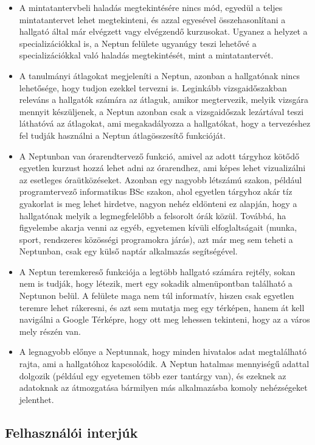 \documentclass[a4paper,12pt]{report}
\begin{document}
\begin{itemize}
    \item A mintatantervbeli haladás megtekintésére nincs mód, egyedül a teljes mintatantervet lehet megtekinteni, és azzal egyesével összehasonlítani a hallgató által már elvégzett vagy elvégzendő kurzusokat. Ugyanez a helyzet a specializációkkal is, a Neptun felülete ugyanúgy teszi lehetővé a specializációkkal való haladás megtekintését, mint a mintatantervét.
    \item A tanulmányi átlagokat megjeleníti a Neptun, azonban a hallgatónak nincs lehetősége, hogy tudjon ezekkel tervezni is. Leginkább vizsgaidőszakban releváns a hallgatók számára az átlaguk, amikor megtervezik, melyik vizsgára mennyit készüljenek, a Neptun azonban csak a vizsgaidőszak lezártával teszi láthatóvá az átlagokat, ami megakadályozza a hallgatókat, hogy a tervezéshez fel tudják használni a Neptun átlagösszesítő funkcióját.
    \item A Neptunban van órarendtervező funkció, amivel az adott tárgyhoz kötődő egyetlen kurzust hozzá lehet adni az órarendhez, ami képes lehet vizualizálni az esetleges óraütközéseket. Azonban egy nagyobb létszámú szakon, például programtervező informatikus BSc szakon, ahol egyetlen tárgyhoz akár tíz gyakorlat is meg lehet hirdetve, nagyon nehéz eldönteni ez alapján, hogy a hallgatónak melyik a legmegfelelőbb a felsorolt órák közül. Továbbá, ha figyelembe akarja venni az egyéb, egyetemen kívüli elfoglaltságait (munka, sport, rendszeres közösségi programokra járás), azt már meg sem teheti a Neptunban, csak egy külső naptár alkalmazás segítségével.
    \item A Neptun teremkereső funkciója a legtöbb hallgató számára rejtély, sokan nem is tudják, hogy létezik, mert egy sokadik almenüpontban található a Neptunon belül. A felülete maga nem túl informatív, hiszen csak egyetlen teremre lehet rákeresni, és azt sem mutatja meg egy térképen, hanem át kell navigálni a Google Térképre, hogy ott meg lehessen tekinteni, hogy az a város mely részén van.
    \item A legnagyobb előnye a Neptunnak, hogy minden hivatalos adat megtalálható rajta, ami a hallgatóhoz kapcsolódik. A Neptun hatalmas mennyiségű adattal dolgozik (például egy egyetemen több ezer tantárgy van), és ezeknek az adatoknak az átmozgatása bármilyen más alkalmazásba komoly nehézségeket jelenthet.
\end{itemize}

\subsection{Felhasználói interjúk}
\end{document}
